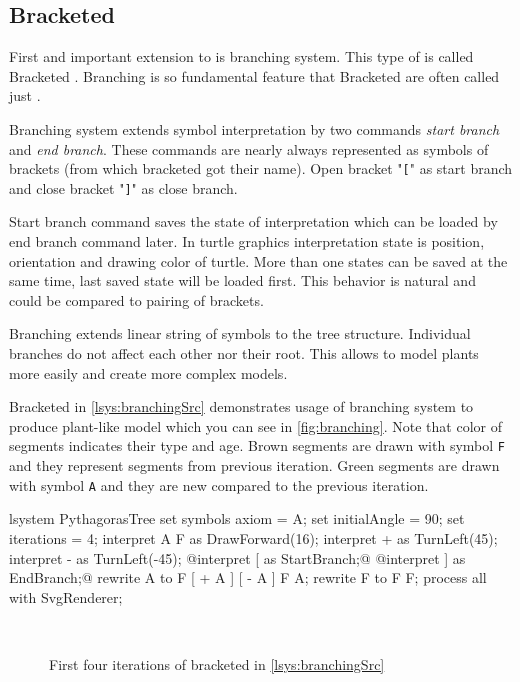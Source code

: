\subsection{Bracketed \lsystems}

First and important extension to \dzerolsystem is branching system.
This type of \lsystem is called Bracketed \lsystem\cite{PL91}.
Branching is so fundamental feature that Bracketed \lsystems are often called just \lsystems.

Branching system extends symbol interpretation by two commands \emph{start branch} and \emph{end branch}.
These commands are nearly always represented as symbols of brackets (from which bracketed \lsystems got their name).
Open bracket "\texttt{[}" as start branch and close bracket "\texttt{]}" as close branch.

Start branch command saves the state of interpretation which can be loaded by end branch command later.
In turtle graphics interpretation state is position, orientation and drawing color of turtle.
More than one states can be saved at the same time, last saved state will be loaded first.
This behavior is natural and could be compared to pairing of brackets.

Branching extends linear string of symbols to the tree structure.
Individual branches do not affect each other nor their root.
This allows to model plants more easily and create more complex models.

Bracketed \lsystem in \autoref{lsys:branchingSrc} demonstrates usage of branching system to produce plant-like model which you can see in \autoref{fig:branching}.
Note that color of segments indicates their type and age.
Brown segments are drawn with symbol \texttt{F} and they represent segments from previous iteration.
Green segments are drawn with symbol \texttt{A} and they are new compared to the previous iteration.

\begin{Lsystem}[label=lsys:branchingSrc,caption={Bracketed \lsystem which creates plant-like model (\autoref{fig:branching})}]
lsystem PythagorasTree {
	set symbols axiom = A;
	set initialAngle = 90;
	set iterations = 4;	
	interpret A F as DrawForward(16);
	interpret + as TurnLeft(45);
	interpret - as TurnLeft(-45);
	@interpret [ as StartBranch;@
	@interpret ] as EndBranch;@
	rewrite A to F [ + A ] [ - A ] F A;
	rewrite F to F F;
}
process all with SvgRenderer;
\end{Lsystem}

\begin{figure}[h]
	\centering
	 ~
	 ~
	 ~
	\caption{First four iterations of bracketed \lsystem in \autoref{lsys:branchingSrc}}
	\label{fig:branching}
\end{figure}



